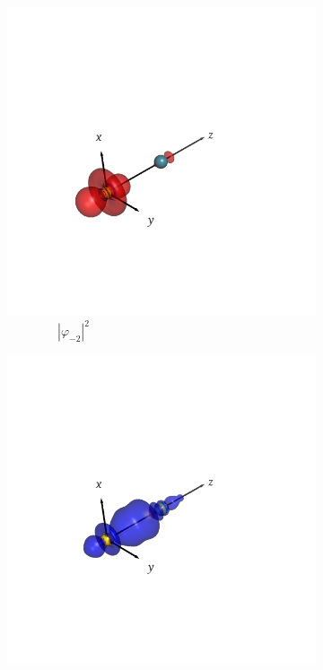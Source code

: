 \documentclass[journal=inoraj,manuscript=article]{achemso}
\begin{document}
\begin{figure}[!h]
    \vspace{0.0cm}
    \begin{subfigure}[t]{0.32\textwidth}
        \centering
        \includegraphics[width=\linewidth]{./AuRn+/nocv-3.png}
        \caption*{\ \ \ \ \ \ \ \ $|\varphi_{-2}|^2$}
    \end{subfigure}
    \hfill
    \begin{subfigure}[t]{0.32\textwidth}
        \centering
        \includegraphics[width=\linewidth]{./AuRn+/nocv+3.png}

\end{subfigure}
\end{figure}
\end{document}
